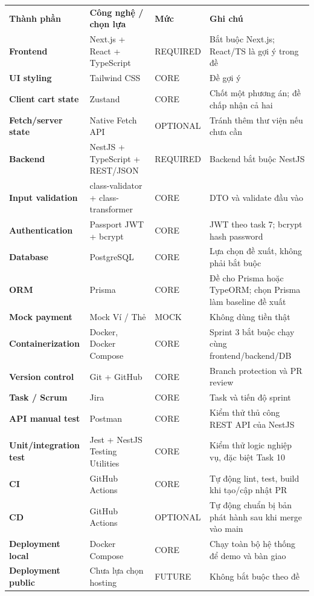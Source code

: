\documentclass[11pt,a4paper,oneside]{report}
\begin{document}
\begin{longtable}[]{@{}
  >{\raggedright\arraybackslash}p{}
  >{\raggedright\arraybackslash}p{}
  >{\raggedright\arraybackslash}p{}
  >{\raggedright\arraybackslash}p{}@{}}
\toprule\noalign{}
\endhead
\bottomrule\noalign{}
\endlastfoot
\textbf{Thành phần} & \textbf{Công nghệ / chọn lựa} & \textbf{Mức} & \textbf{Ghi chú} \\
\textbf{Frontend} & Next.js + React + TypeScript & REQUIRED & Bắt buộc Next.js; React/TS là gợi ý trong đề \\
\textbf{UI styling} & Tailwind CSS & CORE & Đề gợi ý \\
\textbf{Client cart state} & Zustand & CORE & Chốt một phương án; đề chấp nhận cả hai \\
\textbf{Fetch/server state} & Native Fetch API & OPTIONAL & Tránh thêm thư viện nếu chưa cần \\
\textbf{Backend} & NestJS + TypeScript + REST/JSON & REQUIRED & Backend bắt buộc NestJS \\
\textbf{Input validation} & class-validator + class-transformer & CORE & DTO và validate đầu vào \\
\textbf{Authentication} & Passport JWT + bcrypt & CORE & JWT theo task 7; bcrypt hash password \\
\textbf{Database} & PostgreSQL & CORE & Lựa chọn đề xuất, không phải bắt buộc \\
\textbf{ORM} & Prisma & CORE & Đề cho Prisma hoặc TypeORM; chọn Prisma làm baseline đề xuất \\
\textbf{Mock payment} & Mock Ví / Thẻ & MOCK & Không dùng tiền thật \\
\textbf{Containerization} & Docker, Docker Compose & CORE & Sprint 3 bắt buộc chạy cùng frontend/backend/DB \\
\textbf{Version control} & Git + GitHub & CORE & Branch protection và PR review \\
\textbf{Task / Scrum} & Jira & CORE & Task và tiến độ sprint \\
\textbf{API manual test} & Postman & CORE & Kiểm thử thủ công REST API của NestJS \\
\textbf{Unit/integration test} & Jest + NestJS Testing Utilities & CORE & Kiểm thử logic nghiệp vụ, đặc biệt Task 10 \\
\textbf{CI} & GitHub Actions & CORE & Tự động lint, test, build khi tạo/cập nhật PR \\
\textbf{CD} & GitHub Actions & OPTIONAL & Tự động chuẩn bị bản phát hành sau khi merge vào main \\
\textbf{Deployment local} & Docker Compose & CORE & Chạy toàn bộ hệ thống để demo và bàn giao \\
\textbf{Deployment public} & Chưa lựa chọn hosting & FUTURE & Không bắt buộc theo đề \\
\end{longtable}
\end{document}
